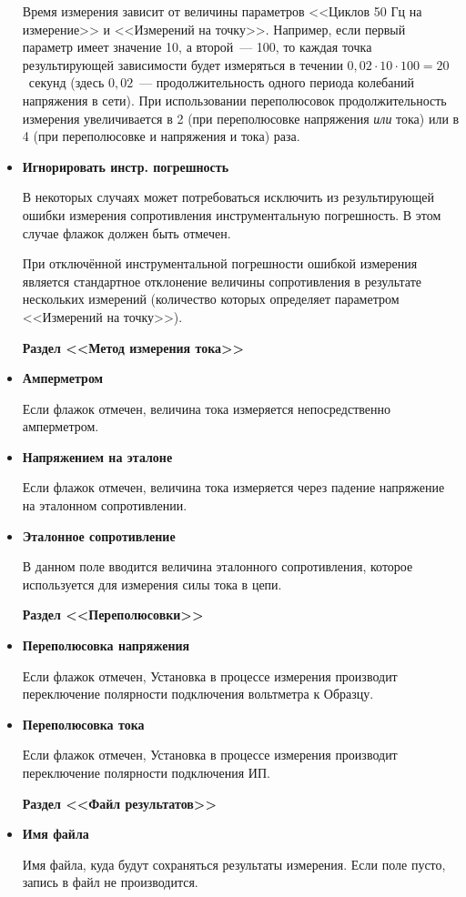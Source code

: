 \documentclass[12pt, a4paper, twocolumn]{book}
\newcommand{\PARAM}[1]{\item {\bf #1} }
\newcommand{\PARAMSECTION}[1]{\vbox{}{\bf Раздел <<#1>>}}
\begin{document}
\begin{itemize}
Время измерения зависит от величины параметров <<Циклов 50 Гц на измерение>> и <<Измерений на точку>>. Например, если первый параметр имеет значение 10, а второй~--- 100, то каждая точка результирующей зависимости будет измеряться в течении $0,02 \cdot 10 \cdot 100 = 20$~секунд (здесь $0,02$~--- продолжительность одного периода колебаний напряжения в сети). При использовании переполюсовок продолжительность измерения увеличивается в 2 (при переполюсовке напряжения \emph{или} тока) или в 4 (при переполюсовке и напряжения и тока) раза.

\PARAM{Игнорировать инстр. погрешность}

В некоторых случаях может потребоваться исключить из результирующей ошибки измерения сопротивления инструментальную погрешность. В этом случае флажок должен быть отмечен.

При отключённой инструментальной погрешности ошибкой измерения является стандартное отклонение величины сопротивления в результате нескольких измерений (количество которых определяет параметром <<Измерений на точку>>).

\PARAMSECTION{Метод измерения тока}

\PARAM{Амперметром}

Если флажок отмечен, величина тока измеряется непосредственно амперметром.

\PARAM{Напряжением на эталоне}

Если флажок отмечен, величина тока измеряется через падение напряжение на эталонном сопротивлении.

\PARAM{Эталонное сопротивление}

В данном поле вводится величина эталонного сопротивления, которое используется для измерения силы тока в цепи.

\PARAMSECTION{Переполюсовки}

\PARAM{Переполюсовка напряжения}

Если флажок отмечен, Установка в процессе измерения производит переключение полярности подключения вольтметра к Образцу.

\PARAM{Переполюсовка тока}

Если флажок отмечен, Установка в процессе измерения производит переключение полярности подключения ИП.

\PARAMSECTION{Файл результатов}

\PARAM{Имя файла}

Имя файла, куда будут сохраняться результаты измерения. Если поле пусто, запись в файл не производится.


\end{itemize}
\end{document}

